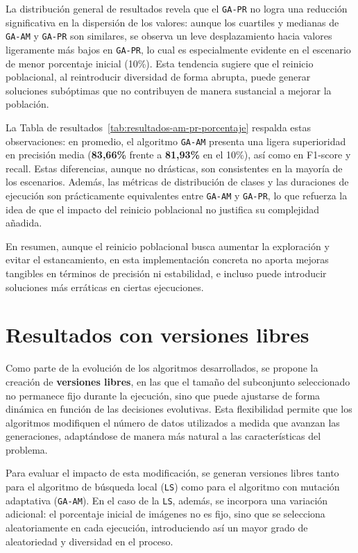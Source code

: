 La distribución general de resultados revela que el \texttt{GA-PR} no logra una reducción significativa en la dispersión de los valores:
aunque los cuartiles y medianas de \texttt{GA-AM} y \texttt{GA-PR} son similares, se observa un leve desplazamiento hacia valores ligeramente más bajos en \texttt{GA-PR},
lo cual es especialmente evidente en el escenario de menor porcentaje inicial (10\%).
Esta tendencia sugiere que el reinicio poblacional, al reintroducir diversidad de forma abrupta,
puede generar soluciones subóptimas que no contribuyen de manera sustancial a mejorar la población.

La Tabla de resultados~\ref{tab:resultados-am-pr-porcentaje} respalda estas observaciones: en promedio,
el algoritmo \texttt{GA-AM} presenta una ligera superioridad en precisión media (\textbf{83,66\%} frente a \textbf{81,93\%} en el 10\%), así como en F1-score y recall.
Estas diferencias, aunque no drásticas, son consistentes en la mayoría de los escenarios.
Además, las métricas de distribución de clases y las duraciones de ejecución son prácticamente equivalentes entre \texttt{GA-AM} y \texttt{GA-PR},
lo que refuerza la idea de que el impacto del reinicio poblacional no justifica su complejidad añadida.

En resumen, aunque el reinicio poblacional busca aumentar la exploración y evitar el estancamiento,
en esta implementación concreta no aporta mejoras tangibles en términos de precisión ni estabilidad,
e incluso puede introducir soluciones más erráticas en ciertas ejecuciones.

\section{Resultados con versiones libres}\label{sec:resultados-versiones-libres}
Como parte de la evolución de los algoritmos desarrollados, se propone la creación de \textbf{versiones libres},
en las que el tamaño del subconjunto seleccionado no permanece fijo durante la ejecución, sino que puede ajustarse de forma dinámica en función de las decisiones evolutivas.
Esta flexibilidad permite que los algoritmos modifiquen el número de datos utilizados a medida que avanzan las generaciones,
adaptándose de manera más natural a las características del problema.

Para evaluar el impacto de esta modificación, se generan versiones libres tanto para el algoritmo de búsqueda local (\texttt{LS})
como para el algoritmo con mutación adaptativa (\texttt{GA-AM}).
En el caso de la \texttt{LS}, además, se incorpora una variación adicional: el porcentaje inicial de imágenes no es fijo,
sino que se selecciona aleatoriamente en cada ejecución, introduciendo así un mayor grado de aleatoriedad y diversidad en el proceso.


